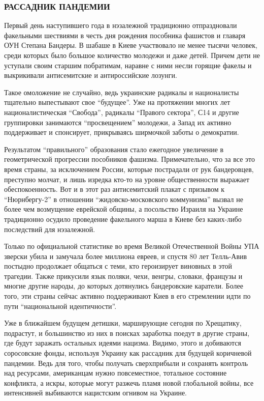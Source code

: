 \subsubsection{РАССАДНИК ПАНДЕМИИ}

Первый день наступившего года в нэзалежной традиционно отпраздновали факельными
шествиями в честь дня рождения пособника фашистов и главаря ОУН Степана
Бандеры. В шабаше в Киеве участвовало не менее тысячи человек, среди которых
было большое количество молодежи и даже детей. Причем дети не уступали своим
старшим побратимам, наравне с ними несли горящие факелы и выкрикивали
антисемитские и антироссийские лозунги.

Такое омоложение не случайно, ведь украинские радикалы и националисты тщательно
выпестывают свое \enquote{будущее}. Уже на протяжении многих лет националистическая
\enquote{Свобода}, радикалы \enquote{Правого сектора}, С14 и другие группировки занимаются
\enquote{просвещением} молодежи, а Запад их активно поддерживает и спонсирует,
прикрываясь ширмочкой заботы о демократии.

Результатом \enquote{правильного} образования стало ежегодное увеличение в
геометрической прогрессии пособников фашизма. Примечательно, что за все это
время страны, за исключением России, которые пострадали от рук бандеровцев,
преступно молчат, и лишь изредка кто-то на уровне общественности выражает
обеспокоенность. Вот и в этот раз антисемитский плакат с призывом к
\enquote{Нюрнбергу-2} в отношении \enquote{жидовско-московского коммунизма}
вызвал не более чем возмущение еврейской общины, а посольство Израиля на
Украине традиционно осудило проведение факельного марша в Киеве без каких-либо
последствий для нэзалежной.

Только по официальной статистике во время Великой Отечественной Войны УПА
зверски убила и замучала более миллиона евреев, и спустя 80 лет Телль-Авив
постыдно продолжает общаться с теми, кто героизирует виновных в этой трагедии.
Также прикусили язык поляки, чехи, венгры, словаки, французы и многие другие
народы, до которых дотянулись бандеровские каратели. Более того, эти страны
сейчас активно поддерживают Киев в его стремлении идти по пути \enquote{национальной
идентичности}. 

Уже в ближайшем будущем детишки, марширующие сегодня по Хрещатику, подрастут, и
большинство из них в поисках заработка поедут в другие страны, где будут
заражать остальных идеями нацизма. Видимо, этого и добиваются соросовские
фонды, используя Украину как рассадник для будущей коричневой пандемии. Ведь
для того, чтобы получать сверхприбыли и сохранять контроль над ресурсами,
американцам нужно повсеместное, тотальное состояние конфликта, а искры, которые
могут разжечь пламя новой глобальной войны, все интенсивней выбиваются
нацистским огнивом на Украине.

